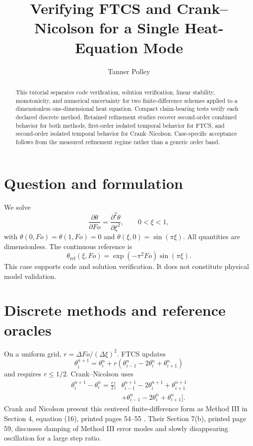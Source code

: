 \documentclass[11pt]{article}
\title{Verifying FTCS and Crank--Nicolson for a Single Heat-Equation Mode}
\author{Tanner Polley}
\date{}
\begin{document}
\maketitle

\begin{abstract}
This tutorial separates code verification, solution verification, linear
stability, monotonicity, and numerical uncertainty for two finite-difference
schemes applied to a dimensionless one-dimensional heat equation. Compact
claim-bearing tests verify each declared discrete method. Retained refinement
studies recover second-order combined behavior for both methods, first-order
isolated temporal behavior for FTCS, and second-order isolated temporal
behavior for Crank--Nicolson. Case-specific acceptance follows from the
measured refinement regime rather than a generic order band.
\end{abstract}

\section{Question and formulation}

We solve
\begin{equation}
  \frac{\partial\theta}{\partial Fo}
  =\frac{\partial^2\theta}{\partial\xi^2},
  \qquad 0<\xi<1,
\end{equation}
with \(\theta(0,Fo)=\theta(1,Fo)=0\) and
\(\theta(\xi,0)=\sin(\pi\xi)\). All quantities are dimensionless. The
continuous reference is
\begin{equation}
  \theta_{\mathrm{ref}}(\xi,Fo)
  =\exp(-\pi^2Fo)\sin(\pi\xi).
\end{equation}
This case supports code and solution verification. It does not constitute
physical model validation.

\section{Discrete methods and reference oracles}

On a uniform grid, \(r=\Delta Fo/(\Delta\xi)^2\). FTCS updates
\begin{equation}
  \theta_i^{n+1}=\theta_i^n+r
  (\theta_{i-1}^n-2\theta_i^n+\theta_{i+1}^n)
\end{equation}
and requires \(r\leq1/2\). Crank--Nicolson uses
\begin{equation}
\begin{split}
  \theta_i^{n+1}-\theta_i^n=\frac{r}{2}\big[&
  \theta_{i-1}^{n+1}-2\theta_i^{n+1}+\theta_{i+1}^{n+1}\\
  &+\theta_{i-1}^{n}-2\theta_i^n+\theta_{i+1}^n\big].
\end{split}
\end{equation}
Crank and Nicolson present this centered finite-difference form as Method III
in Section 4, equation (16), printed pages 54--55
\citep{crankPracticalMethodNumerical1947}. Their Section 7(b), printed page 59,
discusses damping of Method III error modes and slowly disappearing oscillation
for a large step ratio.
\end{document}

